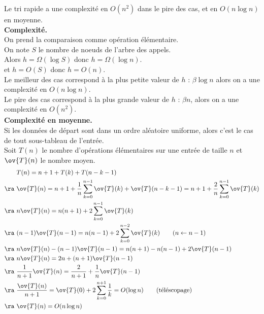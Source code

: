 \documentclass[french, 11pt]{article}
\begin{document}
\begin{prop}{}{}
    Le tri rapide a une complexité en $O(n^2)$ dans le pire des cas, et en $O(n\log n)$ en moyenne.\\
    \textbf{Complexité.}\\
    On prend la comparaison comme opération élémentaire.\\
    On note $S$ le nombre de noeuds de l'arbre des appels.\\
    Alors $h=\Omega(\log S)$ donc $h=\Omega(\log n)$.\\
    et $h=O(S)$ donc $h=O(n)$.\\
    Le meilleur des cas correspond à la plus petite valeur de $h$ : $\beta\log n$ alors on a une complexité en $O(n\log n)$.\\
    Le pire des cas correspond à la plus grande valeur de $h$ : $\beta n$, alors on a une complexité en $O(n^2)$.\\
    \textbf{Complexité en moyenne.}\\
    Si les données de départ sont dans un ordre aléatoire uniforme, alors c'est le cas de tout sous-tableau de l'entrée.\\
    Soit $T(n)$ le nombre d'opérations élémentaires sur une entrée de taille $n$ et $\ov{T}(n)$ le nombre moyen.
    \begin{align*}
        &T(n) = n + 1 + T(k) + T(n - k - 1)\\
        \ra~&\ov{T}(n) = n+1+\frac{1}{n}\sum_{k=0}^{n-1}{\ov{T}(k)+\ov{T}(n-k-1)}=n+1+\frac{2}{n}\sum_{k=0}^{n-1}\ov{T}(k)\\
        \ra~&n\ov{T}(n) = n(n+1) + 2\sum_{k=0}^{n-1}\ov{T}(k)\\
        \ra~&(n-1)\ov{T}(n-1)=n(n-1) + 2\sum_{k=0}^{n-2}\ov{T}(k) \qquad (n \gets n-1)\\
        \ra~&n\ov{T}(n) - (n-1)\ov{T}(n-1) = n(n+1) - n(n-1)+2\ov{T}(n-1)\\
        \ra~&n\ov{T}(n) = 2n +(n+1)\ov{T}(n-1)\\
        \ra~&\frac{1}{n+1}\ov{T}(n)=\frac{2}{n+1}+\frac{1}{n}\ov{T}(n-1)\\
        \ra~&\frac{\ov{T}(n)}{n+1}=\ov{T}(0) + 2\sum_{k=0}^{n+1}\frac{1}{k} = O(\log n) \qquad \text{(téléscopage)}\\
        \ra~&\ov{T}(n)=O(n\log n)
    \end{align*}
\end{prop}
\end{document}
